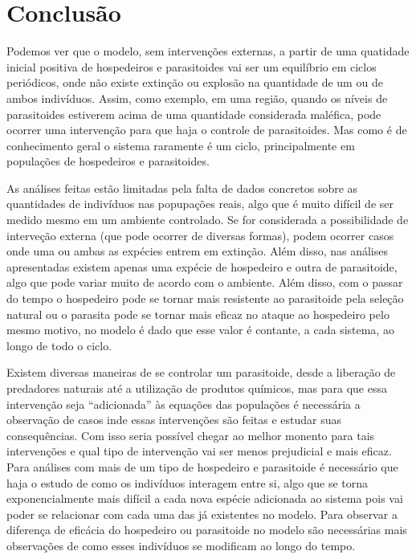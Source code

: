 \section{Conclusão}

Podemos ver que o modelo, sem intervenções externas, a partir de uma quatidade inicial positiva de hospedeiros e parasitoides vai ser um equilíbrio em ciclos periódicos, onde não existe extinção ou explosão na quantidade de um ou de ambos indivíduos. Assim, como exemplo, em uma região, quando os níveis de parasitoides estiverem acima de uma quantidade considerada maléfica, pode ocorrer uma intervenção para que haja o controle de parasitoides. Mas como é de conhecimento geral o sistema raramente é um ciclo, principalmente em populações de hospedeiros e parasitoides.

As análises feitas estão limitadas pela falta de dados concretos sobre as quantidades de indivíduos nas popupações reais, algo que é muito difícil de ser medido mesmo em um ambiente controlado. Se for considerada a possibilidade de interveção externa (que pode ocorrer de diversas formas), podem ocorrer casos onde uma ou ambas as expécies entrem em extinção. Além disso, nas análises apresentadas existem apenas uma expécie de hospedeiro e outra de parasitoide, algo que pode variar muito de acordo com o ambiente. Além disso, com o passar do tempo o hospedeiro pode se tornar mais resistente ao parasitoide pela seleção natural ou o parasita pode se tornar mais eficaz no ataque ao hospedeiro pelo mesmo motivo, no modelo é dado que esse valor é contante, a cada sistema, ao longo de todo o ciclo.

Existem diversas maneiras de se controlar um parasitoide, desde a liberação de predadores naturais até a utilização de produtos químicos, mas para que essa intervenção seja “adicionada” às equações das populações é necessária a observação de casos inde essas intervenções são feitas e estudar suas consequências. Com isso seria possível chegar ao melhor monento para tais intervenções e qual tipo de intervenção vai ser menos prejudicial e mais eficaz. Para análises com mais de um tipo de hospedeiro e parasitoide é necessário que haja o estudo de como os indivíduos interagem entre si, algo que se torna exponencialmente mais difícil a cada nova espécie adicionada ao sistema pois vai poder se relacionar com cada uma das já existentes no modelo. Para observar a diferença de eficácia do hospedeiro ou parasitoide no modelo são necessárias mais observações de como esses indivíduos se modificam ao longo do tempo.

